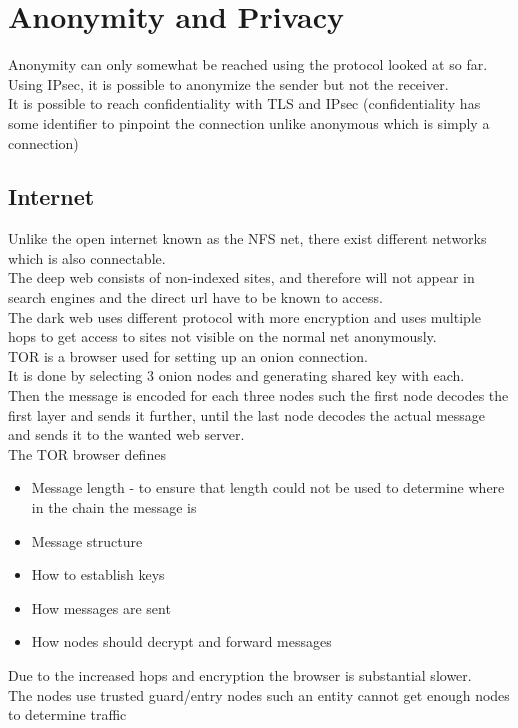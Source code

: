 \documentclass[12pt, a4paper]{article}
\begin{document}
	\section{Anonymity and Privacy}
		Anonymity can only somewhat be reached using the protocol looked at so far.\\
		Using IPsec, it is possible to anonymize the sender but not the receiver.\\
		It is possible to reach confidentiality with TLS and IPsec (confidentiality has some identifier to pinpoint the connection unlike anonymous which is simply a connection)\\
		\subsection{Internet}
			Unlike the open internet known as the NFS net, there exist different networks which is also connectable.\\
			The deep web consists of non-indexed sites, and therefore will not appear in search engines and the direct url have to be known to access.\\
			The dark web uses different protocol with more encryption and uses multiple hops to get access to sites  not visible on the normal net anonymously.\\
			TOR is a browser used for setting up an onion connection.\\
			It is done by selecting 3 onion nodes and generating shared key with each.\\
			Then the message is encoded for each three nodes such the first node decodes the first layer and sends it further, until the last node decodes the actual message and sends it to the wanted web server.\\
			The TOR browser defines
			\begin{itemize}
				\item Message length - to ensure that length could not be used to determine where in the chain the message is
				\item Message structure
				\item How to establish keys
				\item How messages are sent
				\item How nodes should decrypt and forward messages
			\end{itemize}
			Due to the increased hops and encryption the browser is substantial slower.\\
			The nodes use trusted guard/entry nodes such an entity cannot get enough nodes to determine traffic
\end{document}
